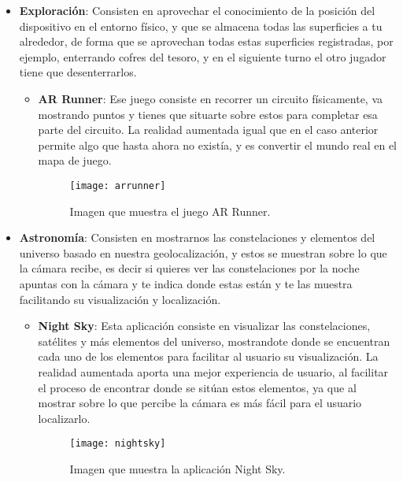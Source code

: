 \begin{itemize}
  \newpage

  \item \textbf{Exploración}: Consisten en aprovechar el conocimiento de la posición del dispositivo en el entorno físico, y que se almacena todas las superficies a tu alrededor, de forma que se aprovechan todas estas superficies registradas, por ejemplo, enterrando cofres del tesoro, y en el siguiente turno el otro jugador tiene que desenterrarlos.

  \begin{itemize}
    \item \textbf{AR Runner}: Ese juego consiste en recorrer un circuito físicamente, va mostrando puntos y tienes que situarte sobre estos para completar esa parte del circuito. La realidad aumentada igual que en el caso anterior permite algo que hasta ahora no existía, y es convertir el mundo real en el mapa de juego.

    \begin{figure}[h]
      \centering
      \texttt{[image: arrunner]}
      \caption{Imagen que muestra el juego AR Runner.\protect\footnotemark}
      \label{figura-ar-runner}
    \end{figure}

  \end{itemize}

  \item \textbf{Astronomía}: Consisten en mostrarnos las constelaciones y elementos del universo basado en nuestra geolocalización, y estos se muestran sobre lo que la cámara recibe, es decir si quieres ver las constelaciones por la noche apuntas con la cámara y te indica donde estas están y te las muestra facilitando su visualización y localización.

  \begin{itemize}
    \item \textbf{Night Sky}: Esta aplicación consiste en visualizar las constelaciones, satélites y más elementos del universo, mostrandote donde se encuentran cada uno de los elementos para facilitar al usuario su visualización. La realidad aumentada aporta una mejor experiencia de usuario, al facilitar el proceso de encontrar donde se sitúan estos elementos, ya que al mostrar sobre lo que percibe la cámara es más fácil para el usuario localizarlo.

    \begin{figure}[h]
      \centering
      \texttt{[image: nightsky]}
      \caption{Imagen que muestra la aplicación Night Sky.\protect\footnotemark}
      \label{figura-night-sky}
    \end{figure}


\end{itemize}
\end{itemize}
